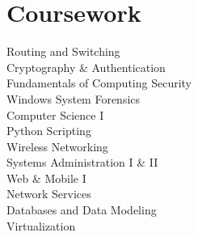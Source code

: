 \documentclass[]{deedy-resume-openfont}
\begin{document}
\begin{minipage}[t]{0.33\textwidth}


\section{Coursework}
Routing and Switching \\
Cryptography \& Authentication \\
Fundamentals of Computing Security \\
Windows System Forensics \\
Computer Science I \\
Python Scripting \\
Wireless Networking \\
Systems Administration I \& II \\
Web \& Mobile I \\
Network Services \\
Databases and Data Modeling \\
Virtualization
\sectionsep



\end{minipage}
\end{document}

